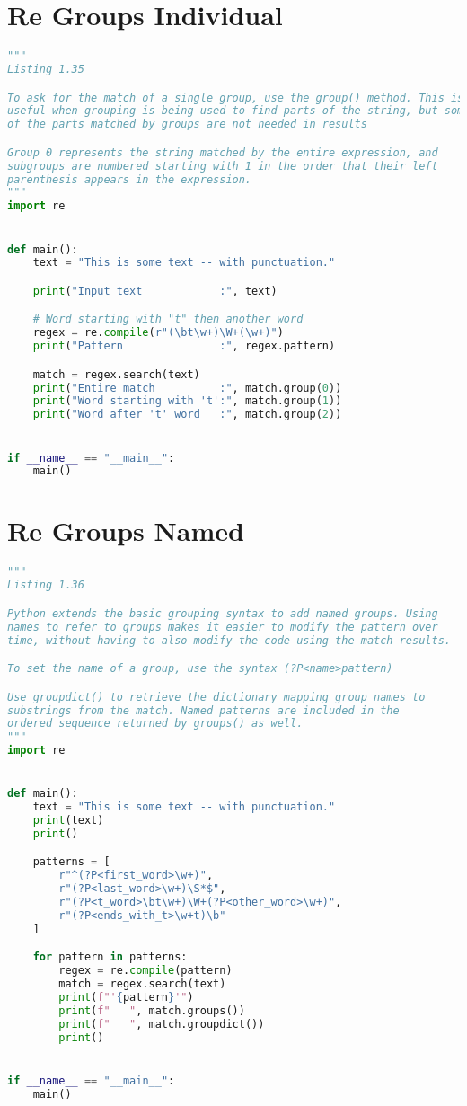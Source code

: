\documentclass[a4paper,landscape]{report}
\begin{document}
\section{Re Groups Individual}
\begin{lstlisting}[language=Python]
"""
Listing 1.35

To ask for the match of a single group, use the group() method. This is
useful when grouping is being used to find parts of the string, but some
of the parts matched by groups are not needed in results

Group 0 represents the string matched by the entire expression, and
subgroups are numbered starting with 1 in the order that their left
parenthesis appears in the expression.
"""
import re


def main():
    text = "This is some text -- with punctuation."

    print("Input text            :", text)

    # Word starting with "t" then another word
    regex = re.compile(r"(\bt\w+)\W+(\w+)")
    print("Pattern               :", regex.pattern)

    match = regex.search(text)
    print("Entire match          :", match.group(0))
    print("Word starting with 't':", match.group(1))
    print("Word after 't' word   :", match.group(2))


if __name__ == "__main__":
    main()

\end{lstlisting}
\section{Re Groups Named}
\begin{lstlisting}[language=Python]
"""
Listing 1.36

Python extends the basic grouping syntax to add named groups. Using
names to refer to groups makes it easier to modify the pattern over
time, without having to also modify the code using the match results.

To set the name of a group, use the syntax (?P<name>pattern)

Use groupdict() to retrieve the dictionary mapping group names to
substrings from the match. Named patterns are included in the
ordered sequence returned by groups() as well.
"""
import re


def main():
    text = "This is some text -- with punctuation."
    print(text)
    print()

    patterns = [
        r"^(?P<first_word>\w+)",
        r"(?P<last_word>\w+)\S*$",
        r"(?P<t_word>\bt\w+)\W+(?P<other_word>\w+)",
        r"(?P<ends_with_t>\w+t)\b"
    ]

    for pattern in patterns:
        regex = re.compile(pattern)
        match = regex.search(text)
        print(f"'{pattern}'")
        print(f"   ", match.groups())
        print(f"   ", match.groupdict())
        print()


if __name__ == "__main__":
    main()

\end{lstlisting}
\end{document}
